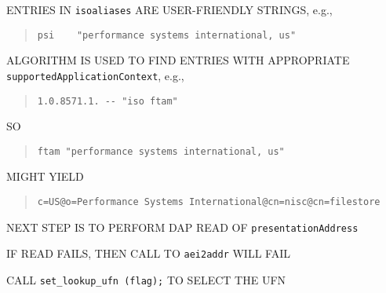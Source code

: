 \begin{bwslide}

\begin{nrtc}
\item	ENTRIES IN \verb"isoaliases" ARE USER-FRIENDLY STRINGS,
	e.g.,
\begin{quote}\small\begin{verbatim}
psi    "performance systems international, us"
\end{verbatim}\end{quote}

\item	ALGORITHM IS USED TO FIND ENTRIES WITH APPROPRIATE
	\verb"supportedApplicationContext", e.g.,
\begin{quote}\small\begin{verbatim}
1.0.8571.1. -- "iso ftam"
\end{verbatim}\end{quote}
	SO
\begin{quote}\small\begin{verbatim}
ftam "performance systems international, us"
\end{verbatim}\end{quote}
	MIGHT YIELD
\begin{quote}\small\begin{verbatim}
c=US@o=Performance Systems International@cn=nisc@cn=filestore
\end{verbatim}\end{quote}

\item	NEXT STEP IS TO PERFORM DAP READ OF \verb"presentationAddress"

\item	IF READ FAILS, THEN CALL TO \verb"aei2addr" WILL FAIL

\item	CALL \verb"set_lookup_ufn (flag);" TO SELECT THE UFN
\end{nrtc}
\end{bwslide}




